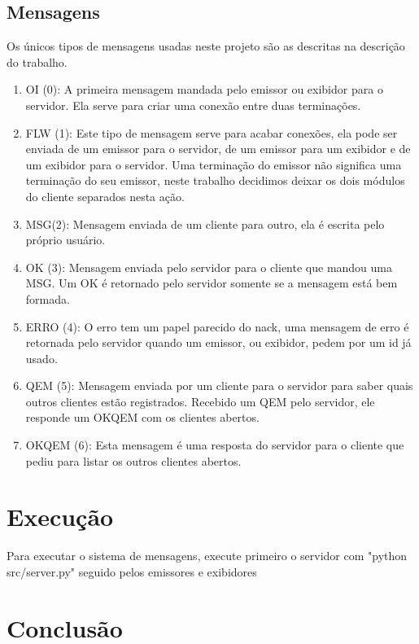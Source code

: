 \documentclass[11pt]{article}
\begin{document}
\subsection{Mensagens}
Os únicos tipos de mensagens usadas neste projeto são as descritas na descrição do trabalho.
\begin{enumerate}
\item OI (0): A primeira mensagem mandada pelo emissor ou exibidor para o servidor. Ela serve para criar uma conexão entre duas terminações.

\item FLW (1): Este tipo de mensagem serve para acabar conexões, ela pode ser enviada de um emissor para o servidor, de um emissor para um exibidor e de um exibidor para o servidor.
Uma terminação do emissor não significa uma terminação do seu emissor, neste trabalho decidimos deixar os dois módulos do cliente separados nesta ação.

\item MSG(2): Mensagem enviada de um cliente para outro, ela é escrita pelo próprio usuário.

\item OK (3): Mensagem enviada pelo servidor para o cliente que mandou uma MSG. Um OK é retornado pelo servidor somente se a mensagem está bem formada.

\item ERRO (4): O erro tem um papel parecido do nack, uma mensagem de erro é retornada pelo servidor quando um emissor, ou exibidor, pedem por um id já usado.

\item QEM (5): Mensagem enviada por um cliente para o servidor para saber quais outros clientes estão registrados. Recebido um QEM pelo servidor, ele responde um OKQEM com os clientes abertos.

\item OKQEM (6): Esta mensagem é uma resposta do servidor para o cliente que pediu para listar os outros clientes abertos.

\end{enumerate}


\section {Execução}
Para executar o sistema de mensagens, execute primeiro o servidor com "python src/server.py" seguido pelos emissores e exibidores


\section{Conclusão}
\end{document}
